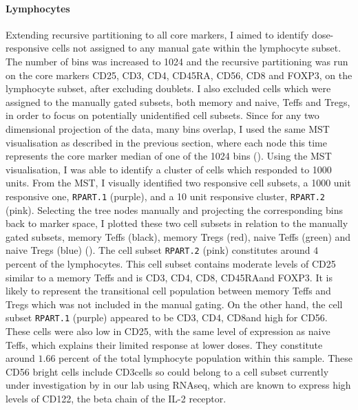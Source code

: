 \clearpage

\paragraph{Lymphocytes} 
Extending recursive partitioning to all core markers, I aimed to identify dose-responsive cells not assigned to any manual gate within the lymphocyte subset.
The number of bins was increased to 1024 and the recursive partitioning was run on the core markers CD25, CD3, CD4, CD45RA, CD56, CD8 and FOXP3, on the lymphocyte subset, after excluding doublets.
I also excluded cells which were assigned to the manually gated subsets, both memory and naive, Teffs and Tregs, in order to focus on potentially unidentified cell subsets.
Since for any two dimensional projection of the data, many bins overlap, I used the same \gls{MST} visualisation as described in the previous section, where each node this time represents the core marker median of one of the 1024 bins ().
Using the \gls{MST} visualisation, I was able to identify a cluster of cells which responded to 1000 units.
From the MST, I visually identified two responsive cell subsets, a 1000 unit responsive one, \texttt{RPART.1} (purple), and a 10 unit responsive cluster, \texttt{RPART.2} (pink).
Selecting the tree nodes manually and projecting the corresponding bins back to marker space, I plotted these two cell subsets in relation to the manually gated subsets, memory Teffs (black), memory Tregs (red), naive Teffs (green) and naive Tregs (blue) ().
The cell subset \texttt{RPART.2} (pink) constitutes around $4$ percent of the lymphocytes.
This cell subset contains moderate levels of CD25 similar to a memory Teffs and is CD3\positive, CD4\positive, CD8\negative, CD45RA\negative and FOXP3\negative.
It is likely to represent the transitional cell population between memory Teffs and Tregs which was not included in the manual gating.
On the other hand, the cell subset \texttt{RPART.1} (purple) appeared to be CD3\negative, CD4\negative, CD8\negative and high for CD56.
These cells were also low in CD25, with the same level of expression as naive Teffs, which explains their limited response at lower doses.
They constitute around $1.66$ percent of the total lymphocyte population within this sample.
These CD56 bright cells include CD3\negative cells so could belong to a cell subset currently under investigation by  in our lab using RNAseq, which are known to express high levels of CD122, the beta chain of the IL-2 receptor.

